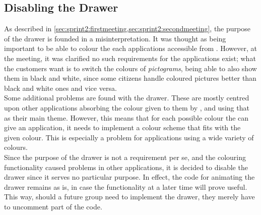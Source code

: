\subsection{Disabling the Drawer}
As described in \cref{sec:sprint2:firstmeeting,sec:sprint2:secondmeeting}, the purpose of the drawer is founded in a misinterpretation.
It was thought as being important to be able to colour the each \giraf applications accessible from \launcher.
However, at the meeting, it was clarified no such requirements for the applications exist;
what the customers want is to switch the colours of \textit{pictograms}, being able to also show them in black and white, since some citizens handle coloured pictures better than black and white ones and vice versa.\\

Some additional problems are found with the drawer.
These are mostly centred upon other applications absorbing the colour given to them by \launcher, and using that as their main theme.
However, this means that for each possible colour the \launcher can give an application, it needs to implement a colour scheme that fits with the given colour.
This is especially a problem for applications using a wide variety of colours.\\

Since the purpose of the drawer is not a requirement per se, and the colouring functionality caused problems in other applications, it is decided to disable the drawer since it serves no particular purpose.
In effect, the code for animating the drawer remains as is, in case the functionality at a later time will prove useful.
This way, should a future group need to implement the drawer, they merely have to uncomment part of the code.
